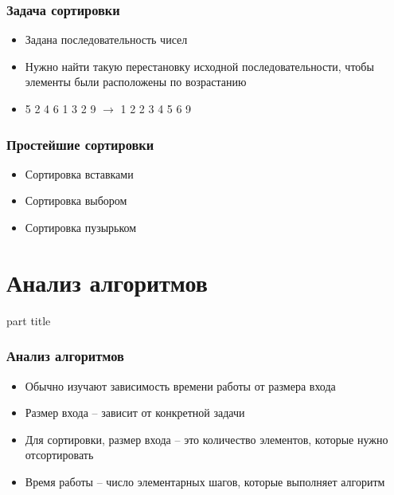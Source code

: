 \documentclass[14pt,pdf,hyperref={unicode}]{beamer}
\begin{document}
\begin{frame}[fragile]
\frametitle{Задача сортировки} 
\begin{itemize}
\item Задана последовательность чисел \\
\item Нужно найти такую перестановку исходной последовательности, чтобы элементы были расположены по возрастанию  \\
\item 5 2 4 6 1 3 2 9  $\rightarrow$ 1 2 2 3 4 5 6 9
\end{itemize}
\end{frame}


\begin{frame}[fragile]
\frametitle{Простейшие сортировки} 
\begin{itemize}
\item Сортировка вставками \\
\item Сортировка выбором \\
\item Сортировка пузырьком \\
\end{itemize}
\end{frame}


\section{Анализ алгоритмов}
\begin{frame}
\begin{center}
\begin{beamercolorbox}[sep=8pt,center]{part
title}
\insertsection
\end{beamercolorbox}
\end{center}
\end{frame}

\begin{frame}[fragile]
\frametitle{Анализ алгоритмов} 
\begin{itemize}
\item Обычно изучают зависимость времени работы от размера входа \\
\item Размер входа -- зависит от конкретной задачи \\
\item Для сортировки, размер входа -- это количество элементов, которые нужно отсортировать \\
\item Время работы -- число элементарных шагов, которые выполняет алгоритм
\end{itemize}
\end{frame}
\end{document}

